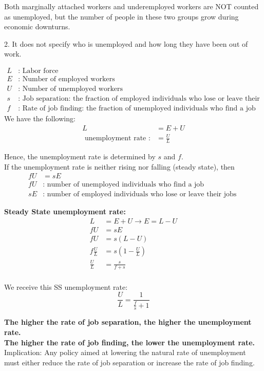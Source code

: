 \documentclass[12pt]{article}
\begin{document}
Both marginally attached workers and underemployed workers are NOT counted as
unemployed, but the number of people in these two groups grow during economic
downturns.



2. It does not specify who is unemployed and how long they have been out of work.





\begin{align*}
L&: \text{ Labor force}\\
E&: \text{ Number of employed workers }\\
U&: \text{ Number of unemployed workers }\\
s&: \text{ Job separation: the fraction of employed individuals who lose or leave their
job each month}\\
f&: \text{ Rate of job finding: the fraction of unemployed individuals who find a job
each month}
\end{align*}
We have the following:
\begin{align*}
L &= E + U\\
\text{ unemployment rate }:&= \frac{U}{L}
\end{align*}



Hence, the unemployment rate is determined by $ s $ and $ f $.\\
If the unemployment rate is neither rising nor falling (steady state), 
then
\begin{align*}
fU &= sE\\
fU&: \text{ number of unemployed individuals who find a job }\\
sE&: \text{ number of employed individuals who lose or leave their jobs }
\end{align*}




{\textbf {Steady State unemployment rate:}}
\begin{align*}
L &= E + U \rightarrow E = L - U\\
fU &= sE\\
fU &= s(L - U)\\
f \frac{U}{L} &= s(1 - \frac{U}{L})\\
\frac{U}{L}  &= \frac{s}{f + s}\\
\end{align*}

We receive this SS unemployment rate:
\begin{equation*}
\frac{U}{L} = \frac{1}{\frac{f}{s} + 1}
\end{equation*}


{\textbf {The higher the rate of job separation, the higher the unemployment rate.}}\\
{\textbf {The higher the rate of job finding, the lower the unemployment rate.}}\\
Implication: Any policy aimed at lowering the natural rate of unemployment must either
reduce the rate of job separation or increase the rate of job finding.
\end{document}
